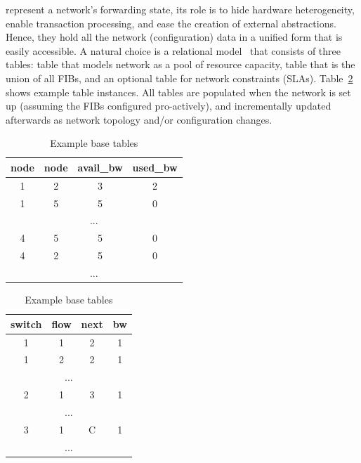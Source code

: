  represent a network's
forwarding state, its role is to hide hardware heterogeneity, enable
transaction processing, and ease the creation of external
abstractions. Hence, they hold all the network
(configuration) data in a unified form that is easily accessible.  A
natural choice is a relational model~\cite{hull_relative_1984} that 
consists of three tables:  table that models network as a
pool of resource capacity,  table that is the union
of all FIBs, and an optional  table for 
network constraints (\eg SLAs).  \Eg Table~\ref{table:base-table}
shows example table instances.
All tables are populated when the network is set up (assuming the FIBs
configured pro-actively), and incrementally updated afterwards as
network topology and/or configuration changes.

\begin{table}[ht!]
\begin{subtable}[t]{0.5\linewidth}
  {
    \footnotesize
      \begin{tabular}[t!]{c|c|c|c}
        \centering
        node & node & avail\_bw  & used\_bw \\
        \hline
        1 & 2 & 3 & 2 \\
        1 & 5 & 5 & 0 \\
        \multicolumn{4}{c}{...}\\
        \hline
        4 & 5 & 5 & 0 \\
        4 & 2 & 5 & 0 \\ 
        \multicolumn{4}{c}{...}
        \label{tb:topology}
    \end{tabular}
  }
\end{subtable}
\;
\begin{subtable}[t]{0.45\linewidth}
  {
    \footnotesize
    \centering
    \begin{tabular}[t]{c|c |c|c}
      \centering
      switch & flow & next & bw \\
      \hline
      1 & 1 & 2 & 1 \\
      1 & 2 & 2 & 1  \\
      \multicolumn{4}{c}{...}\\
      \hline
      2 & 1 & 3 & 1 \\
      \multicolumn{4}{c}{...}\\
      \hline
      3 & 1 & C & 1 \\
      \multicolumn{4}{c}{...}
      \label{tb:configuration}
    \end{tabular}
  }
\end{subtable}
\caption{\footnotesize Example base tables}
\label{table:base-table}
\end{table}
\vspace{-1em}

